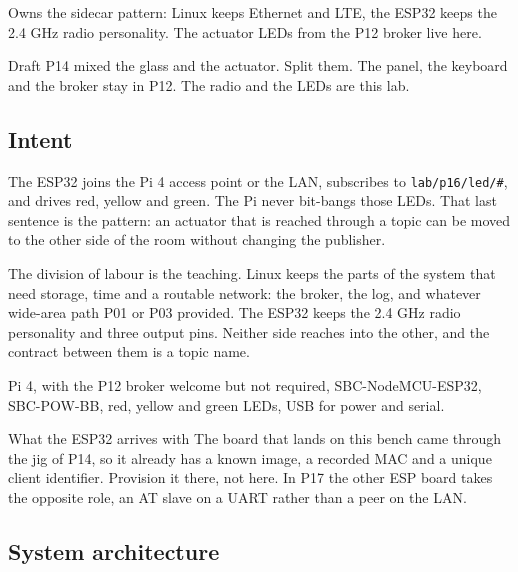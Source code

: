 
\begin{unique}
Owns the sidecar pattern: Linux keeps Ethernet and LTE, the ESP32 keeps the 2.4 GHz radio personality. The actuator LEDs from the P12 broker live here.
\end{unique}

\begin{blueprint}
Draft P14 mixed the glass and the actuator. Split them. The panel, the keyboard and the broker stay in P12. The radio and the LEDs are this lab.
\end{blueprint}

\subsection*{Intent}

The ESP32 joins the Pi 4 access point or the LAN, subscribes to \texttt{lab/p16/led/\#}, and drives red, yellow and green. The Pi never bit-bangs those LEDs. That last sentence is the pattern: an actuator that is reached through a topic can be moved to the other side of the room without changing the publisher.

The division of labour is the teaching. Linux keeps the parts of the system that need storage, time and a routable network: the broker, the log, and whatever wide-area path P01 or P03 provided. The ESP32 keeps the 2.4 GHz radio personality and three output pins. Neither side reaches into the other, and the contract between them is a topic name.

\begin{kit}
Pi 4, with the P12 broker welcome but not required, SBC-NodeMCU-ESP32, SBC-POW-BB, red, yellow and green LEDs, USB for power and serial.
\end{kit}

\begin{note}{What the ESP32 arrives with}
The board that lands on this bench came through the jig of P14, so it already has a known image, a recorded MAC and a unique client identifier. Provision it there, not here. In P17 the other ESP board takes the opposite role, an AT slave on a UART rather than a peer on the LAN.
\end{note}

\subsection*{System architecture}

